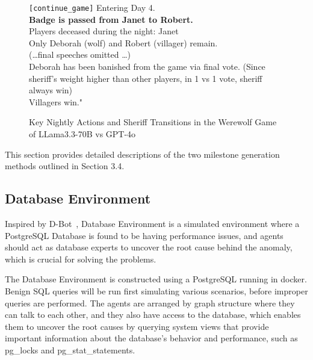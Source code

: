 \begin{figure}[htbp]
\begin{tcolorbox}[colback=green!2!white, colframe=gray!50!green]
\begin{minipage}{\linewidth}
\texttt{[continue\_game]} Entering Day 4.  \\
\textbf{Badge is passed from Janet to Robert.}  \\
Players deceased during the night: Janet  \\

Only Deborah (wolf) and Robert (villager) remain.  \\
(\ldots final speeches omitted \ldots)  \\
Deborah has been banished from the game via final vote. (Since sheriff's weight higher than other players, in 1 vs 1 vote, sheriff always win) \\
Villagers win."\\
\end{minipage}
\end{tcolorbox}
\caption{Key Nightly Actions and Sheriff Transitions in the Werewolf Game of LLama3.3-70B vs GPT-4o}
\label{fig:private_event_log}
\end{figure}


This section provides detailed descriptions of the two milestone generation methods outlined in Section 3.4.

\subsection{Database Environment}
\label{app:database-scenario}

Inspired by D-Bot~\cite{dbot}, Database Environment is a simulated environment where a PostgreSQL Database is found to be having performance issues, and agents should act as database experts to uncover the root cause behind the anomaly, which is crucial for solving the problems.

The Database Environment is constructed using a PostgreSQL running in docker. Benign SQL queries will be run first simulating various scenarios, before improper queries are performed. The agents are arranged by graph structure where they can talk to each other, and they also have access to the database, which enables them to uncover the root causes by querying system views that provide important information about the database's behavior and performance, such as pg\_locks and pg\_stat\_statements.

